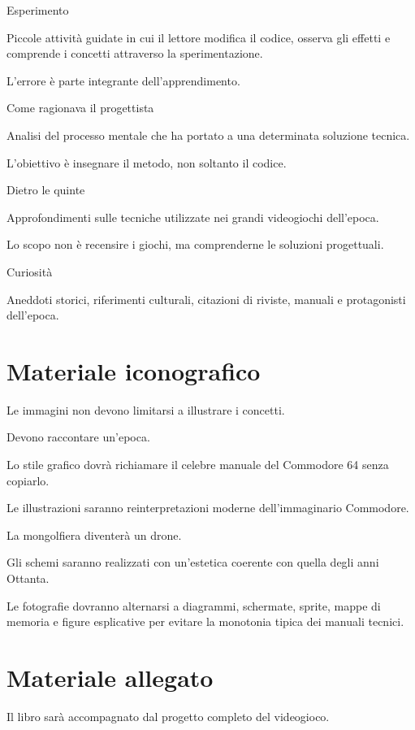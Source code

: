 \documentclass{article}
\begin{document}
Esperimento

Piccole attività guidate in cui il lettore modifica il codice, osserva gli effetti e comprende i concetti attraverso la
sperimentazione.

L'errore è parte integrante dell'apprendimento.

Come ragionava il progettista

Analisi del processo mentale che ha portato a una determinata soluzione tecnica.

L'obiettivo è insegnare il metodo, non soltanto il codice.

Dietro le quinte

Approfondimenti sulle tecniche utilizzate nei grandi videogiochi dell'epoca.

Lo scopo non è recensire i giochi, ma comprenderne le soluzioni progettuali.

Curiosità

Aneddoti storici, riferimenti culturali, citazioni di riviste, manuali e protagonisti dell'epoca.



\section{Materiale iconografico}
Le immagini non devono limitarsi a illustrare i concetti.

Devono raccontare un'epoca.

Lo stile grafico dovrà richiamare il celebre manuale del Commodore 64 senza copiarlo.

Le illustrazioni saranno reinterpretazioni moderne dell'immaginario Commodore.

La mongolfiera diventerà un drone.

Gli schemi saranno realizzati con un'estetica coerente con quella degli anni Ottanta.

Le fotografie dovranno alternarsi a diagrammi, schermate, sprite, mappe di memoria e figure esplicative per evitare la
monotonia tipica dei manuali tecnici.



\section{Materiale allegato}
Il libro sarà accompagnato dal progetto completo del videogioco.
\end{document}
